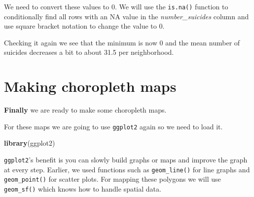 \documentclass[
  12pt,
]{book}
\newenvironment{Shaded}{\begin{snugshade}}{\end{snugshade}}
\newcommand{\CommentTok}[1]{\textcolor[rgb]{0.37,0.37,0.37}{\textit{#1}}}
\newcommand{\DecValTok}[1]{\textcolor[rgb]{0.06,0.06,0.06}{#1}}
\newcommand{\KeywordTok}[1]{\textcolor[rgb]{0.27,0.27,0.27}{\textbf{#1}}}
\newcommand{\NormalTok}[1]{#1}
\newcommand{\OperatorTok}[1]{\textcolor[rgb]{0.43,0.43,0.43}{\textbf{#1}}}
\newcommand{\StringTok}[1]{\textcolor[rgb]{0.5,0.5,0.5}{#1}}
\begin{document}
We need to convert these values to 0. We will use the \texttt{is.na()} function to conditionally find all rows with an NA value in the \emph{number\_suicides} column and use square bracket notation to change the value to 0.

\begin{Shaded}
\end{Shaded}

Checking it again we see that the minimum is now 0 and the mean number of suicides decreases a bit to about 31.5 per neighborhood.

\begin{Shaded}
\end{Shaded}

\hypertarget{making-choropleth-maps}{%
\section{Making choropleth maps}\label{making-choropleth-maps}}

\textbf{Finally} we are ready to make some choropleth maps.

For these maps we are going to use \texttt{ggplot2} again so we need to load it.

\begin{Shaded}
\begin{Highlighting}[]
\KeywordTok{library}\NormalTok{(ggplot2)}
\end{Highlighting}
\end{Shaded}

\texttt{ggplot2}'s benefit is you can slowly build graphs or maps and improve the graph at every step. Earlier, we used functions such as \texttt{geom\_line()} for line graphs and \texttt{geom\_point()} for scatter plots. For mapping these polygons we will use \texttt{geom\_sf()} which knows how to handle spatial data.
\end{document}
